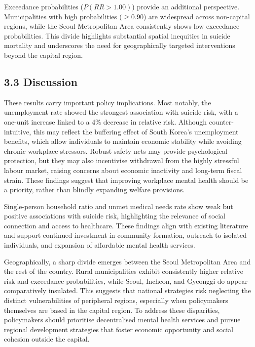 \documentclass[11pt]{article}
\begin{document}
	Exceedance probabilities ($P(RR > 1.00)$) provide an additional perspective. Municipalities with high probabilities ($\geq 0.90$) are widespread across non-capital regions, while the Seoul Metropolitan Area consistently shows low exceedance probabilities. This divide highlights substantial spatial inequities in suicide mortality and underscores the need for geographically targeted interventions beyond the capital region.
	
	\newpage
	\subsection*{3.3 Discussion}
	
	These results carry important policy implications. Most notably, the unemployment rate showed the strongest association with suicide risk, with a one-unit increase linked to a 4\% decrease in relative risk. Although counter-intuitive, this may reflect the buffering effect of South Korea's unemployment benefits, which allow individuals to maintain economic stability while avoiding chronic workplace stressors. Robust safety nets may provide psychological protection, but they may also incentivise withdrawal from the highly stressful labour market, raising concerns about economic inactivity and long-term fiscal strain. These findings suggest that improving workplace mental health should be a priority, rather than blindly expanding welfare provisions.
	
	Single-person household ratio and unmet medical needs rate show weak but positive associations with suicide risk, highlighting the relevance of social connection and access to healthcare. These findings align with existing literature and support continued investment in community formation, outreach to isolated individuals, and expansion of affordable mental health services.
	
	Geographically, a sharp divide emerges between the Seoul Metropolitan Area and the rest of the country. Rural municipalities exhibit consistently higher relative risk and exceedance probabilities, while Seoul, Incheon, and Gyeonggi-do appear comparatively insulated. This suggests that national strategies risk neglecting the distinct vulnerabilities of peripheral regions, especially when policymakers themselves are based in the capital region. To address these disparities, policymakers should prioritise decentralised mental health services and pursue regional development strategies that foster economic opportunity and social cohesion outside the capital.
	
\end{document}
